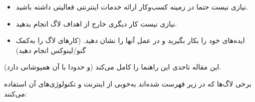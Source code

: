 \begin{itemize}
\item
نیازی نیست حتما در زمینه کسب‌وکار ارائه خدمات اینترنتی فعالیتی داشته باشید.
\item
نیازی نیست کار دیگری خارج از اهداف لاگ انجام بدهید.
\item
ایده‌های خود را بکار بگیرید و در عمل آنها را نشان دهید.
(کارهای لاگ را به‌کمک گنو/لینوکس انجام دهید)
\end{itemize}

این مقاله تاحدی این راهنما را کامل می‌کند (و حدودا با آن همپوشانی دارد).

برخی لاگ‌ها که در زیر فهرست شده‌اند به‌خوبی از اینترنت و تکنولوژی‌های آن استفاده می‌کنند:


